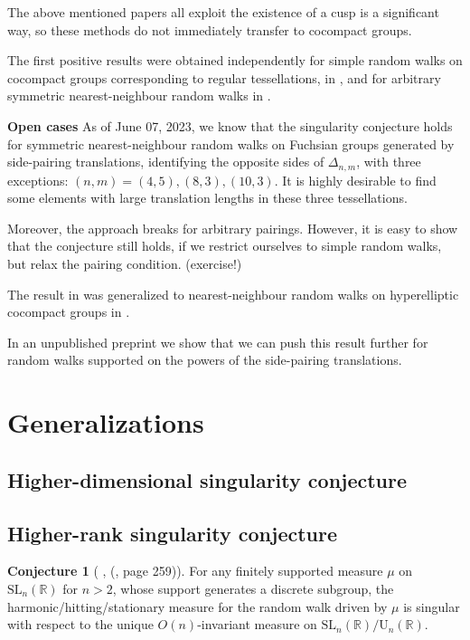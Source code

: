 \documentclass[11pt]{amsart}
\theoremstyle{definition}
\newtheorem{conjecture}{Conjecture}[section]
\begin{document}
	The above mentioned papers all exploit the existence of a cusp is a significant way, so these methods do not immediately transfer to cocompact groups. 
	
	The first positive results were obtained independently for simple random walks on cocompact groups corresponding to regular tessellations, in \cite{Carrasco2019OnTS}, and for arbitrary symmetric nearest-neighbour random walks in \cite{10.1093/imrn/rnaa213}.
	
	\textbf{Open cases} As of June 07, 2023, we know that the singularity conjecture holds for symmetric nearest-neighbour random walks on Fuchsian groups generated by side-pairing translations, identifying the opposite sides of $\Delta_{n, m}$, with three exceptions: $(n, m) = (4, 5), (8, 3), (10, 3)$. It is highly desirable to find some elements with large translation lengths in these three tessellations.
	
	Moreover, the approach breaks for arbitrary pairings. However, it is easy to show that the conjecture still holds, if we restrict ourselves to simple random walks, but relax the pairing condition. (exercise!)
	
	The result in \cite{10.1093/imrn/rnaa213} was generalized to nearest-neighbour random walks on hyperelliptic cocompact groups in \cite{kosenko_tiozzo_2022}.
	
	In an unpublished preprint \cite{kosenko2023asymptotics} we show that we can push this result further for random walks supported on the powers of the side-pairing translations.
	
	\section{Generalizations}
	\subsection{Higher-dimensional singularity conjecture}
	\subsection{Higher-rank singularity conjecture}
	\begin{conjecture}[ \cite{MR2568439}, (\cite{kaimanovich2011matrix}, page 259)]
		\label{Higher rank singularity conjecture}
		For any finitely supported measure $\mu$ on $\text{SL}_n(\mathbb{R})$ for $n > 2$, whose support generates a discrete subgroup, the harmonic/hitting/stationary measure for the random walk driven by $\mu$ is singular with respect to the unique $O(n)$-invariant measure on $\text{SL}_n(\mathbb{R}) / \text{U}_n(\mathbb{R})$.
	\end{conjecture}
	
	\printbibliography
	
\end{document}
